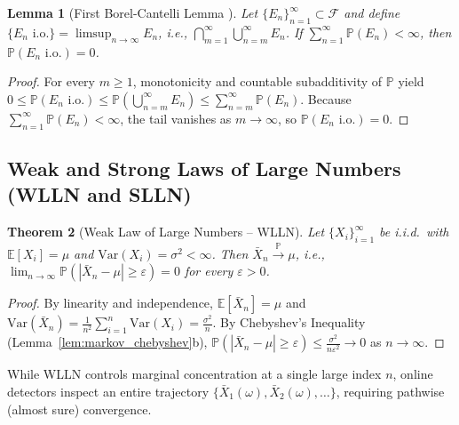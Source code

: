 \documentclass[oneside,noexaminfo,english]{sapthesis}
\numberwithin{equation}{section}
\numberwithin{figure}{section}
\numberwithin{table}{section}
\theoremstyle{compactplain}
\newtheorem{theorem}{Theorem}[section]
\newtheorem{lemma}[theorem]{Lemma}
\theoremstyle{compactdef}
\theoremstyle{compactrem}
\newcommand{\E}{\mathbb{E}}
\newcommand{\Prob}{\mathbb{P}}
\newcommand{\Var}{\mathrm{Var}}
\newcommand{\inp}{\overset{\Prob}{\longrightarrow}}
\begin{document}
\begin{lemma}[First Borel-Cantelli Lemma \cite{billingsley1995}]
\label{lem:borel_cantelli}
Let $\{E_n\}_{n=1}^\infty \subset \mathcal{F}$ and define $\{E_n \text{ i.o.}\} = \limsup_{n\to\infty} E_n$, i.e., $\bigcap_{m=1}^\infty \bigcup_{n=m}^\infty E_n$. If $\sum_{n=1}^\infty \Prob(E_n) < \infty$, then $\Prob(E_n \text{ i.o.}) = 0$.
\end{lemma}
\begin{proof}
For every $m \ge 1$, monotonicity and countable subadditivity of $\Prob$ yield $0 \le \Prob(E_n \text{ i.o.}) \le \Prob(\bigcup_{n=m}^\infty E_n) \le \sum_{n=m}^\infty \Prob(E_n)$. Because $\sum_{n=1}^\infty \Prob(E_n) < \infty$, the tail vanishes as $m \to \infty$, so $\Prob(E_n \text{ i.o.}) = 0$.
\end{proof}

\subsection{Weak and Strong Laws of Large Numbers (WLLN and SLLN)}

\begin{theorem}[Weak Law of Large Numbers -- WLLN]
\label{thm:wlln}
Let $\{X_i\}_{i=1}^\infty$ be i.i.d.\ with $\E[X_i] = \mu$ and $\Var(X_i) = \sigma^2 < \infty$. Then $\bar{X}_n \inp \mu$, i.e., $\lim_{n\to\infty} \Prob(|\bar{X}_n - \mu| \ge \varepsilon) = 0$ for every $\varepsilon > 0$.
\end{theorem}
\begin{proof}
By linearity and independence, $\E[\bar{X}_n] = \mu$ and $\Var(\bar{X}_n) = \frac{1}{n^2}\sum_{i=1}^n \Var(X_i) = \frac{\sigma^2}{n}$. By Chebyshev's Inequality (Lemma~\ref{lem:markov_chebyshev}b), $\Prob(|\bar{X}_n - \mu| \ge \varepsilon) \le \frac{\sigma^2}{n\varepsilon^2} \to 0$ as $n \to \infty$.
\end{proof}

While WLLN controls marginal concentration at a single large index $n$, online detectors inspect an entire trajectory $\{\bar{X}_1(\omega), \bar{X}_2(\omega), \dots\}$, requiring pathwise (almost sure) convergence.
\end{document}
